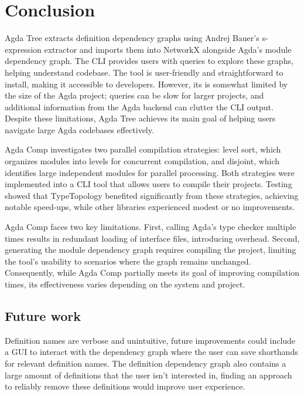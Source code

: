 
\chapter{Conclusion}

Agda Tree extracts definition dependency graphs using Andrej
Bauer's s-expression extractor \cite{andrej} and imports them into NetworkX
alongside Agda's module dependency graph. The CLI provides users with
queries to explore these graphs, helping understand codebase.
The tool is user-friendly and straightforward to install, making it accessible
to developers. However, its is somewhat limited by the size
of the Agda project; queries can be slow for larger projects, and additional
information from the Agda backend can clutter the CLI output. Despite these
limitations, Agda Tree achieves its main goal of helping users navigate
large Agda codebases effectively.

Agda Comp investigates two parallel compilation strategies: level sort, which
organizes modules into levels for concurrent compilation, and disjoint, which
identifies large independent modules for parallel processing. Both strategies
were implemented into a CLI tool that allows users to compile their projects.
Testing showed that TypeTopology benefited significantly from these
strategies, achieving notable speed-ups, while other libraries experienced
modest or no improvements.

Agda Comp faces two key limitations. First, calling Agda's type checker
multiple times results in redundant loading of interface files, introducing
overhead. Second, generating the module dependency graph requires compiling the
project, limiting the tool's usability to scenarios where the graph remains
unchanged. Consequently, while Agda Comp partially meets its goal of improving
compilation times, its effectiveness varies depending on the system and
project.

\section{Future work}

Definition names are verbose and unintuitive, future improvements could include
a GUI to interact with the dependency graph where the user can save shorthands
for relevant definition names. The definition dependency graph also contains a
large amount of definitions that the user isn't interested in, finding an
approach to reliably remove these definitions would improve user experience.

